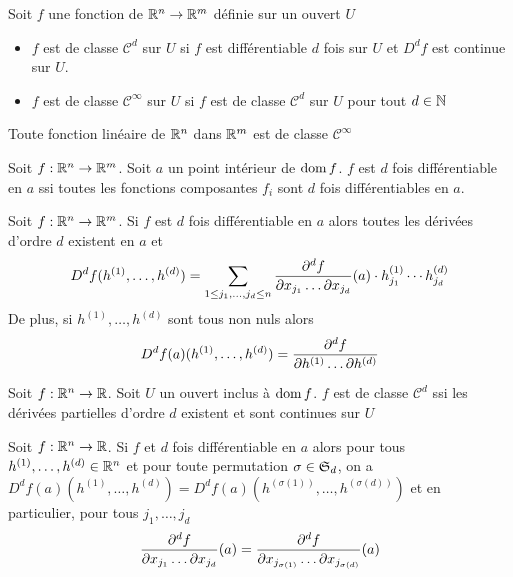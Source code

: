     \begin{definition}
        Soit $f$ une fonction de $\mathbb{R}^n\to\mathbb{R}^m$ définie sur un ouvert $U$
        \begin{itemize}
            \item $f$ est de classe $\mathcal C^d$ sur $U$ si $f$ est différentiable $d$ fois sur $U$ et $D^df$ est continue sur $U$.
            \item $f$ est de classe $\mathcal C^\infty$ sur $U$ si $f$ est de classe $\mathcal C ^d$ sur $U$ pour tout $d\in\mathbb{N}$
        \end{itemize}
    \end{definition}
    \begin{exemple}
        Toute fonction linéaire de $\mathbb{R}^n$ dans $\mathbb{R}^m$ est de classe $\mathcal C^\infty$
    \end{exemple}
    \begin{proposition}
        Soit $f:\mathbb{R}^n\to\mathbb{R}^m$. Soit $a$ un point intérieur de $\operatorname{dom} f$. $f$ est $d$ fois différentiable en $a$ ssi toutes les fonctions composantes $f_i$ sont $d$ fois différentiables en $a$.
    \end{proposition}
    \begin{proposition}
        Soit $f:\mathbb{R}^n\to\mathbb{R}^m$. Si $f$ est $d$ fois différentiable en $a$ alors toutes les dérivées d'ordre $d$ existent en $a$ et $$D^df(h^{(1)},\dotsc, h^{(d)}) = \sum_{1\leq j_1,\dotsc ,j_d\leq n}\frac{\partial ^df}{\partial x_{j_1}\dots \partial x_{j_d}}(a)\cdot h^{(1)}_{j_1}\cdots h^{(d)}_{j_d}$$
        De plus, si $h^{(1)},\dotsc,h^{(d)}$ sont tous non nuls alors $$D^df(a)(h^{(1)},\dotsc,h^{(d)}) = \frac{\partial ^df}{\partial h^{(1)}\ldots \partial h^{(d)}}$$
    \end{proposition}
    \begin{proposition}
        Soit $f : \mathbb{R}^n\to\mathbb{R}$. Soit $U$ un ouvert inclus à $\operatorname{dom} f$. $f$ est de classe $\mathcal C^d$ ssi les dérivées partielles d'ordre $d$ existent et sont continues sur $U$
    \end{proposition}
    \begin{theoreme}
        Soit $f : \mathbb{R}^n\to \mathbb{R}$. Si $f$ et $d$ fois différentiable en $a$ alors pour tous $h^{(1)},\dotsc,h^{(d)}\in\mathbb{R}^n$ et pour toute permutation $\sigma\in\mathfrak{S}_d$, on a $D^df(a)(h^{(1)},\dotsc,h^{(d)}) = D^df(a)(h^{(\sigma(1))},\dotsc,h^{(\sigma(d))})$ et en particulier, pour tous $j_1,\dotsc,j_d$ $$\frac{\partial ^df}{\partial x_{j_1}\dots \partial x_{j_d}}(a) = \frac{\partial ^df}{\partial x_{j_{\sigma(1)}}\dots \partial x_{j_{\sigma(d)}}}(a)$$
    \end{theoreme}
